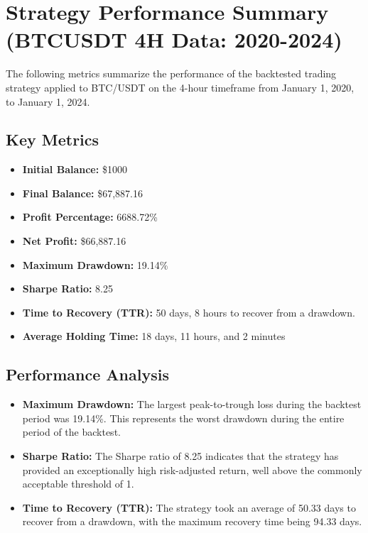 \documentclass[12pt]{article}
\begin{document}
\newpage
\section{Strategy Performance Summary (BTCUSDT 4H Data: 2020-2024)}

The following metrics summarize the performance of the backtested trading strategy applied to BTC/USDT on the 4-hour timeframe from January 1, 2020, to January 1, 2024.

\subsection{Key Metrics}

\begin{itemize}
	\item \textbf{Initial Balance:} \$1000
	\item \textbf{Final Balance:} \$67,887.16
	\item \textbf{Profit Percentage:} 6688.72\%
	\item \textbf{Net Profit:} \$66,887.16

   
 
	\item \textbf{Maximum Drawdown:} 19.14\%
   
	\item \textbf{Sharpe Ratio:} 8.25
   
  \item \textbf{Time to Recovery (TTR):} 50 days, 8 hours to recover from a drawdown.

\item \textbf{Average Holding Time:} 18 days, 11 hours, and 2 minutes

\end{itemize}

\subsection{Performance Analysis}

\begin{itemize}
 
	\item \textbf{Maximum Drawdown:} The largest peak-to-trough loss during the backtest period was 19.14\%. This represents the worst drawdown during the entire period of the backtest.
	\item \textbf{Sharpe Ratio:} The Sharpe ratio of 8.25 indicates that the strategy has provided an exceptionally high risk-adjusted return, well above the commonly acceptable threshold of 1.
   
 

	\item \textbf{Time to Recovery (TTR):} The strategy took an average of 50.33 days to recover from a drawdown, with the maximum recovery time being 94.33 days.
\end{itemize}
\end{document}
